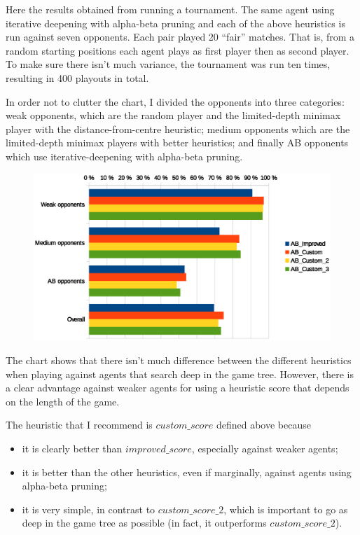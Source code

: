 \documentclass[11pt]{article}
\begin{document}
Here the results obtained from running a tournament. The same agent using iterative deepening with alpha-beta pruning and each of the above heuristics is run against seven opponents. Each pair played 20 ``fair'' matches. That is, from a random starting positions each agent plays as first player then as second player. To make sure there isn't much variance, the tournament was run ten times, resulting in 400 playouts in total.

In order not to clutter the chart, I divided the opponents into three categories: weak opponents, which are the random player and the limited-depth minimax player with the distance-from-centre heuristic; medium opponents which are the limited-depth minimax players with better heuristics; and finally AB opponents which use iterative-deepening with alpha-beta pruning.

\begin{figure}\label{chart}
  \includegraphics[width=\textwidth]{chart.eps}
\end{figure}

The chart shows that there isn't much difference between the different heuristics when playing against agents that search deep in the game tree. However, there is a clear advantage against weaker agents for using a heuristic score that depends on the length of the game.

The heuristic that I recommend is $custom\_score$ defined above because
\begin{itemize}
\item it is clearly better than $improved\_score$, especially against weaker agents;
\item it is better than the other heuristics, even if marginally, against agents using alpha-beta pruning;
\item it is very simple, in contrast to $custom\_score\_2$, which is important to go as deep in the game tree as possible (in fact, it outperforms $custom\_score\_2$).
\end{itemize}
\end{document}
